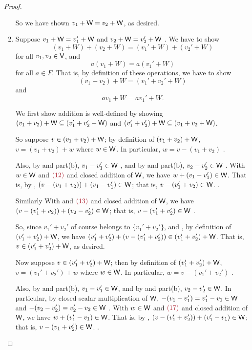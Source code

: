 \begin{proof}
\begin{enumerate}
So we have shown \(v_1 + \textsf{W} = v_2 + \textsf{W}\), as desired.

\item
Suppose \(v_1 + \textsf{W} = v_1' + \textsf{W}\)  and \(v_2 + \textsf{W} = v_2' + \textsf{W}\) .
We have to show
\[
    (v_1 + W) + (v_2 + W) = (v_1' + W) + (v_2' + W)
\]
for all \(v_1, v_2 \in \textsf{V}\), and
\[
    a(v_1 + W) = a(v_1' + W)
\]
for all \(a \in F\).
That is, by definition of these operations, we have to show
\[
    (v_1 + v_2) + W = (v_1' + v_2' + W)
\]
and
\[
    av_1 + W = av_1' + W.
\]

We first show addition is well-defined by showing \((v_1 + v_2) + \textsf{W} \subseteq (v_1' + v_2' + \textsf{W})\) and \((v_1' + v_2') + \textsf{W} \subseteq (v_1 + v_2 + \textsf{W})\).

So suppose \(v \in (v_1 + v_2) + \textsf{W}\);
by definition of \((v_1 + v_2) + \textsf{W}\), \(v = (v_1 + v_2) + w\) where \(w \in \textsf{W}\).
In particular, \(w = v - (v_1 + v_2)\) .

Also, by  and part(b), \(v_1 - v_1' \in \textsf{W}\) , and by  and part(b), \(v_2 - v_2' \in \textsf{W}\) .
With \(w \in \textsf{W}\) and \(\MAROON{(12)}\) and closed addition of \(\textsf{W}\), we have \(w + (v_1 - v_1') \in \textsf{W}\).
That is, by , \((v - (v_1 + v_2)) + (v_1 - v_1') \in \textsf{W}\);
that is, \(v - (v_1' + v_2) \in \textsf{W}\). .

Similarly With  and \(\MAROON{(13)}\) and closed addition of \(\textsf{W}\), we have \((v - (v_1' + v_2)) + (v_2 - v_2') \in \textsf{W}\);
that is, \(v - (v_1' + v_2') \in \textsf{W}\) .

So, since \(v_1' + v_2'\) of course belongs to \(\{ v_1' + v_2' \}\), and , by definition of \((v_1' + v_2') + \textsf{W}\), we have \((v_1' + v_2') + (v - (v_1' + v_2')) \in (v_1' + v_2') + \textsf{W}\).
That is, \(v \in (v_1' + v_2') + \textsf{W}\), as desired.

Now suppose \(v \in (v_1' + v_2') + \textsf{W}\);
then by definition of \((v_1' + v_2') + \textsf{W}\), \(v = (v_1' + v_2') + w\) where \(w \in \textsf{W}\).
In particular, \(w = v - (v_1' + v_2')\) .

Also, by  and part(b), \(v_1 - v_1' \in \textsf{W}\), and by  and part(b), \(v_2 - v_2' \in \textsf{W}\).
In particular, by closed scalar multiplication of \(\textsf{W}\), \(-(v_1 - v_1') = v_1' - v_1 \in \textsf{W}\)  and \(-(v_2 - v_2') = v_2' - v_2 \in \textsf{W}\) .
With \(w \in \textsf{W}\) and \(\MAROON{(17)}\) and closed addition of \(\textsf{W}\), we have \(w + (v_1' - v_1) \in \textsf{W}\).
That is, by , \((v - (v_1' + v_2')) + (v_1' - v_1) \in \textsf{W}\);
that is, \(v - (v_1 + v_2') \in \textsf{W}\). .


\end{enumerate}
\end{proof}
